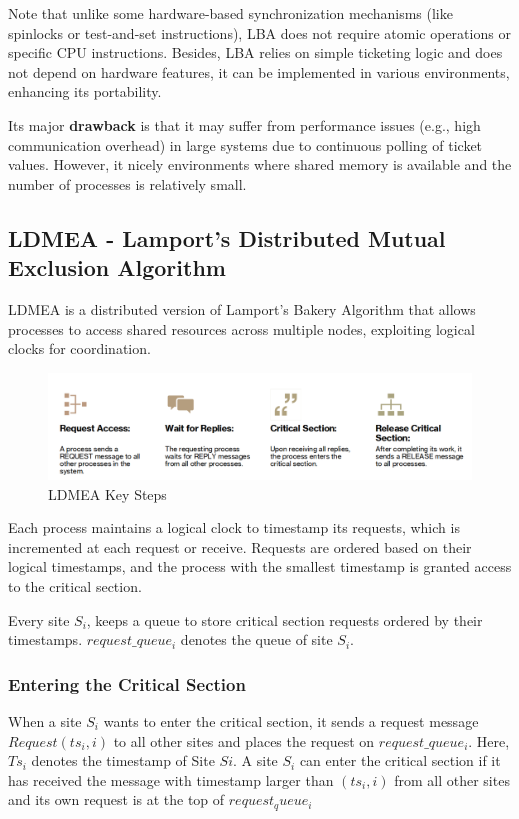 Note that unlike some hardware-based synchronization mechanisms (like spinlocks or test-and-set instructions), LBA does not require atomic operations or specific CPU instructions. Besides, LBA relies on simple ticketing logic and does not depend on hardware features, it can be implemented in various environments, enhancing its portability.

Its major \textbf{drawback} is that it may suffer from performance issues (e.g., high communication overhead) in large systems due to continuous polling of ticket values.
However, it nicely environments where shared memory is available and the number of processes is relatively small.

\subsection{LDMEA - Lamport's Distributed Mutual Exclusion Algorithm}
LDMEA is a distributed version of Lamport's Bakery Algorithm that allows processes to access shared resources across multiple nodes, exploiting logical clocks for coordination.

\begin{figure}[htbp]
   \centering
   \includegraphics{images/04/ldmea_steps.png}
   \caption{LDMEA Key Steps}
   \label{fig:04/ldmea_steps}
\end{figure}

Each process maintains a logical clock to timestamp its requests, which is incremented at each request or receive.
Requests are ordered based on their logical timestamps, and the process with the smallest timestamp is granted access to the critical section.

Every site $S_i$, keeps a queue to store critical section requests ordered
by their timestamps. $request\_queue_i$ denotes the queue of site $S_i$.

\subsubsection{Entering the Critical Section}
When a site $S_i$ wants to enter the critical section, it sends a request message $Request(ts_i, i)$ to all other sites and places the request on $request\_queue_i$. Here, $Ts_i$ denotes the timestamp of Site $Si$.
A site $S_i$ can enter the critical section if it has received the message with timestamp larger than $(ts_i, i)$ from all other sites and its own request is at the top of $request_queue_i$

